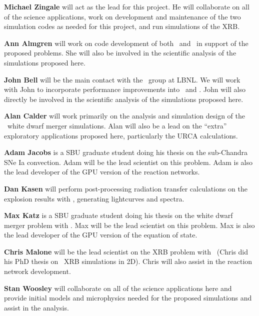 \documentclass[11pt,letterpaper,english]{article}
\begin{document}
\begin{tightitem}
\item {\bf Michael Zingale} will act as the lead for this project.  He
  will collaborate on all of the science applications, work on
  development and maintenance of the two simulation codes as needed
  for this project, and run simulations of the XRB.

\item {\bf Ann Almgren} will work on code development of both \maestro\
  and \castro\ in support of the proposed problems.  She will also be
  involved in the scientific analysis of the simulations proposed here.

\item {\bf John Bell} will be the main contact with the \boxlib\ group
  at LBNL.  We will work with John to incorporate performance
  improvements into \maestro\ and \castro.  John will also directly be
  involved in the scientific analysis of the simulations proposed
  here.

\item {\bf Alan Calder} will work primarily on the analysis and
  simulation design of the \castro\ white dwarf merger simulations.
  Alan will also be a lead on the ``extra'' exploratory applications
  proposed here, particularly the URCA calculations.

\item {\bf Adam Jacobs} is a SBU graduate student doing his thesis on
  the sub-Chandra SNe Ia convection.  Adam will be the lead scientist
  on this problem.  Adam is also the lead developer of the GPU version
  of the reaction networks.

\item {\bf Dan Kasen} will perform post-processing radiation transfer
  calculations on the explosion results with \sedona, generating
  lightcurves and spectra.

\item {\bf Max Katz} is a SBU graduate student doing his thesis on the
  white dwarf merger problem with \castro.  Max will be the lead
  scientist on this problem.  Max is also the lead developer of 
  the GPU version of the equation of state.

\item {\bf Chris Malone} will be the lead scientist on the XRB problem
  with \maestro\ (Chris did his PhD thesis on \maestro\ XRB simulations
  in 2D).  Chris will also assist in the reaction network development.

\item {\bf Stan Woosley} will collaborate on all of the science
  applications here and provide initial models and microphysics needed
  for the proposed simulations and assist in the analysis.

\end{tightitem} 
\end{document}
